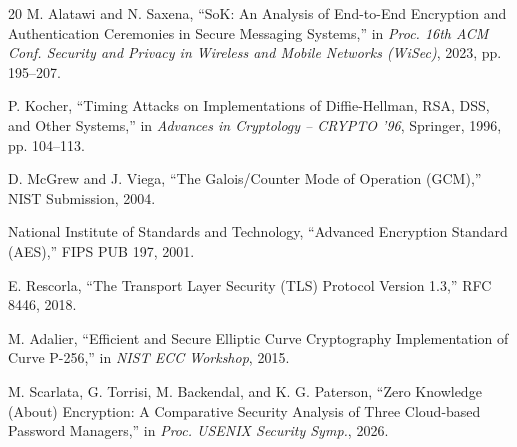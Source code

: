 \documentclass[conference]{IEEEtran}
\begin{document}
\begin{thebibliography}{20}
M. Alatawi and N. Saxena, ``SoK: An Analysis of End-to-End Encryption and Authentication Ceremonies in Secure Messaging Systems,'' in \textit{Proc. 16th ACM Conf. Security and Privacy in Wireless and Mobile Networks (WiSec)}, 2023, pp. 195--207.

P. Kocher, ``Timing Attacks on Implementations of Diffie-Hellman, RSA, DSS, and Other Systems,'' in \textit{Advances in Cryptology -- CRYPTO '96}, Springer, 1996, pp. 104--113.

D. McGrew and J. Viega, ``The Galois/Counter Mode of Operation (GCM),'' NIST Submission, 2004.

National Institute of Standards and Technology, ``Advanced Encryption Standard (AES),'' FIPS PUB 197, 2001.

E. Rescorla, ``The Transport Layer Security (TLS) Protocol Version 1.3,'' RFC 8446, 2018.

M. Adalier, ``Efficient and Secure Elliptic Curve Cryptography Implementation of Curve P-256,'' in \textit{NIST ECC Workshop}, 2015.

M. Scarlata, G. Torrisi, M. Backendal, and K. G. Paterson, ``Zero Knowledge (About) Encryption: A Comparative Security Analysis of Three Cloud-based Password Managers,'' in \textit{Proc. USENIX Security Symp.}, 2026.

\end{thebibliography}
\end{document}
